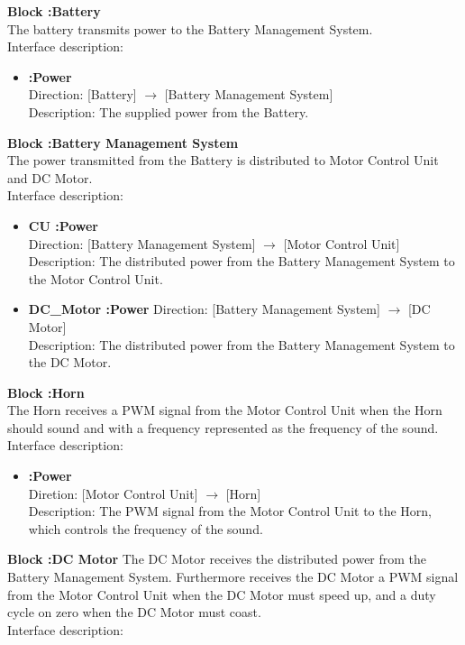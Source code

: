 \textbf{Block :Battery}\\
The battery transmits power to the Battery Management System.\\Interface description:

\begin{itemize}
	\item \textbf{:Power}\\
		Direction: [Battery] $\rightarrow$ [Battery Management System]\\
		Description: The supplied power from the Battery.
\end{itemize}

\textbf{Block :Battery Management System}\\
The power transmitted from the Battery is distributed to Motor Control Unit and DC Motor.\\
Interface description:

\begin{itemize}
	\item \textbf{CU :Power}\\
		Direction: [Battery Management System] $\rightarrow$ [Motor Control Unit]\\
		Description: The distributed power from the Battery Management System to the Motor Control Unit.
	\item \textbf{DC\_Motor :Power}
		Direction: [Battery Management System] $\rightarrow$ [DC Motor]\\
		Description: The distributed power from the Battery Management System to the DC Motor.
\end{itemize}

\textbf{Block :Horn}\\
The Horn receives a PWM signal from the Motor Control Unit when the Horn should sound and with a frequency represented as the frequency of the sound.\\
Interface description:

\begin{itemize}
	\item \textbf{:Power}\\
		Diretion: [Motor Control Unit] $\rightarrow$ [Horn]\\
		Description: The PWM signal from the Motor Control Unit to the Horn, which controls the frequency of the sound.
\end{itemize}

\textbf{Block :DC Motor}
The DC Motor receives the distributed power from the Battery Management System. Furthermore receives the DC Motor a PWM signal from the Motor Control Unit when the DC Motor must speed up, and a duty cycle on zero when the DC Motor must coast.\\
Interface description:

